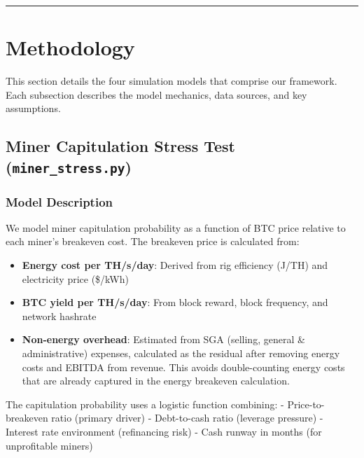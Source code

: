 \documentclass[
  11pt,
]{article}
\providecommand{\tightlist}{%
  \setlength{\itemsep}{0pt}\setlength{\parskip}{0pt}}\usepackage{longtable,booktabs,array}
\let\oldsection\section
\renewcommand{\section}[1]{\FloatBarrier\oldsection{#1}}
\let\oldsubsection\subsection
\renewcommand{\subsection}[1]{\FloatBarrier\oldsubsection{#1}}
\begin{document}
\begin{center}\rule{0.5\linewidth}{0.5pt}\end{center}

\hypertarget{methodology}{%
\section{Methodology}\label{methodology}}

This section details the four simulation models that comprise our
framework. Each subsection describes the model mechanics, data sources,
and key assumptions.

\hypertarget{miner-capitulation-stress-test-miner_stress.py}{%
\subsection{\texorpdfstring{Miner Capitulation Stress Test
(\texttt{miner\_stress.py})}{Miner Capitulation Stress Test (miner\_stress.py)}}\label{miner-capitulation-stress-test-miner_stress.py}}

\hypertarget{model-description}{%
\subsubsection{Model Description}\label{model-description}}

We model miner capitulation probability as a function of BTC price
relative to each miner's breakeven cost. The breakeven price is
calculated from:

\begin{itemize}
\tightlist
\item
  \textbf{Energy cost per TH/s/day}: Derived from rig efficiency (J/TH)
  and electricity price (\$/kWh)
\item
  \textbf{BTC yield per TH/s/day}: From block reward, block frequency,
  and network hashrate
\item
  \textbf{Non-energy overhead}: Estimated from SGA (selling, general \&
  administrative) expenses, calculated as the residual after removing
  energy costs and EBITDA from revenue. This avoids double-counting
  energy costs that are already captured in the energy breakeven
  calculation.
\end{itemize}

The capitulation probability uses a logistic function combining: -
Price-to-breakeven ratio (primary driver) - Debt-to-cash ratio (leverage
pressure) - Interest rate environment (refinancing risk) - Cash runway
in months (for unprofitable miners)
\end{document}
